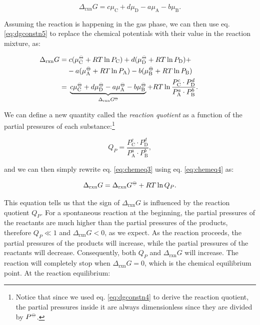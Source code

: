 \documentclass[
  9pt,
]{extbook}
\theoremstyle{definition}
\theoremstyle{definition}
\theoremstyle{definition}
\theoremstyle{definition}
\theoremstyle{remark}
\begin{document}
\begin{equation}
\Delta_{\text{rxn}} G = c \mu_{\text{C}} + d \mu_{\text{D}} - a \mu_{\text{A}}- b\mu_{\text{B}}.
\label{eq:chemeq2}
\end{equation}

Assuming the reaction is happening in the gas phase, we can then use eq. \eqref{eq:dgconstn5} to replace the chemical potentials with their value in the reaction mixture, as:

\begin{equation}
\begin{aligned}
\mkern-60mu \Delta_{\text{rxn}} G =& \; c (\mu_{\text{C}}^{-\kern-6pt{\ominus}\kern-6pt-}+RT \ln P_{\text{C}}) + d (\mu_{\text{D}}^{-\kern-6pt{\ominus}\kern-6pt-}+RT \ln P_{\text{D}}) +\\ & - a (\mu_{\text{A}}^{-\kern-6pt{\ominus}\kern-6pt-}+RT \ln P_{\text{A}}) - b (\mu_{\text{B}}^{-\kern-6pt{\ominus}\kern-6pt-}+RT \ln P_{\text{B}}) \\
  =& \; \underbrace{c \mu_{\text{C}}^{-\kern-6pt{\ominus}\kern-6pt-}+ d \mu_{\text{D}}^{-\kern-6pt{\ominus}\kern-6pt-}- a \mu_{\text{A}}^{-\kern-6pt{\ominus}\kern-6pt-}- b\mu_{\text{B}}^{-\kern-6pt{\ominus}\kern-6pt-}}_{\Delta_{\text{rxn}} G^{-\kern-6pt{\ominus}\kern-6pt-}}  +RT \ln \frac{P_{\text{C}}^c \cdot P_{\text{D}}^d}{P_{\text{A}}^a \cdot P_{\text{B}}^b}.
\end{aligned}
\label{eq:chemeq3}
\end{equation}

We can define a new quantity called the \emph{reaction quotient} as a function of the partial pressures of each substance:\footnote{Notice that since we used eq. \eqref{eq:dgconstn4} to derive the reaction quotient, the partial pressures inside it are always dimensionless since they are divided by \(P^{-\kern-6pt{\ominus}\kern-6pt-}\).}

\begin{equation}
Q_P = \frac{P_{\text{C}}^c \cdot P_{\text{D}}^d}{P_{\text{A}}^a \cdot P_{\text{B}}^b},
\label{eq:chemeq4}
\end{equation}

and we can then simply rewrite eq. \eqref{eq:chemeq3} using eq. \eqref{eq:chemeq4} as:

\begin{equation}
\Delta_{\text{rxn}} G = \Delta_{\text{rxn}} G^{-\kern-6pt{\ominus}\kern-6pt-}+ RT \ln Q_P.
\label{eq:chemeq5}
\end{equation}

This equation tells us that the sign of \(\Delta_{\text{rxn}} G\) is influenced by the reaction quotient \(Q_P\). For a spontaneous reaction at the beginning, the partial pressures of the reactants are much higher than the partial pressures of the products, therefore \(Q_P \ll 1\) and \(\Delta_{\text{rxn}} G < 0\), as we expect. As the reaction proceeds, the partial pressures of the products will increase, while the partial pressures of the reactants will decrease. Consequently, both \(Q_P\) and \(\Delta_{\text{rxn}} G\) will increase. The reaction will completely stop when \(\Delta_{\text{rxn}} G = 0\), which is the chemical equilibrium point. At the reaction equilibrium:
\end{document}

